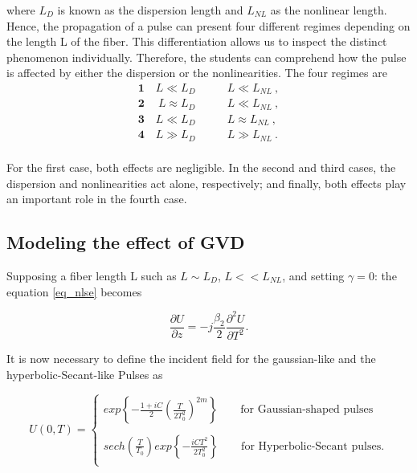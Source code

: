         where $L_D$ is known as the dispersion length and $L_{NL}$ as the nonlinear length. Hence, the propagation of a pulse can present four different regimes depending on the length L of the fiber. This differentiation allows us to inspect the distinct phenomenon individually. Therefore, the students can comprehend how the pulse is affected by either the dispersion or the nonlinearities. The four regimes are 
        \begin{equation}
            \begin{aligned}\label{eq_lregimes}
               \mathbf{1} \quad L \ll L_D \quad & \quad L \ll  L_{NL} \ , \\
              \mathbf{2} \ \quad L \approx L_D \quad & \quad L \ll  L_{NL} \ , \\
               \mathbf{3} \quad L \ll L_D \quad & \quad L \approx  L_{NL} \ , \\
               \mathbf{4} \quad L \gg L_D \quad & \quad L \gg  L_{NL} \ . \\
            \end{aligned}
        \end{equation} 
        
        For the first case, both effects are negligible. In the second and third cases, the dispersion and nonlinearities act alone, respectively; and finally, both effects play an important role in the fourth case.
        
        \subsection{Modeling the effect of GVD}\label{subsect:gvd}
   
    
        
        Supposing a fiber length L such as $L \sim L_D$, $L << L_{NL}$, and setting $\gamma = 0$:  the equation \eqref{eq_nlse} becomes 
        
         \begin{equation}\label{eq_ugvd}
            \frac{\partial U}{\partial z} = -j\frac{\beta_2}{2}\frac{\partial^2U}{\partial T^2}.
        \end{equation}

        It is now necessary to define the incident field for the gaussian-like and the hyperbolic-Secant-like Pulses as 
            
        \begin{equation}\label{eq_u0t}
            U(0,T) = 
            \begin{cases}
                exp \left\{ -\frac{1+iC}{2} \left(\frac{T}{2T^2_0} \right)^{2m} \right\} \qquad \text{for Gaussian-shaped pulses}  \\
                \ \\
                sech\left( \frac{T}{T_0}\right) exp \left\{ -\frac{iCT^2}{2T^2_0} \right\} \qquad \text{for Hyperbolic-Secant pulses}.  \\
            \end{cases}
        \end{equation}
        
